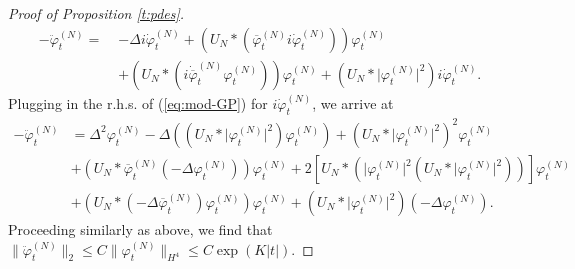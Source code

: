 \documentclass[11pt,a4paper,DIV11]{scrartcl}	%
\newcommand{\ph}{\varphi_t^{(N)}}	%
\newcommand{\phdot}{\dot{\varphi}_t^{(N)}}	%
\newcommand{\phddot}{\ddot{\varphi}_t^{(N)}}	%
\begin{document}
\begin{proof}[Proof of Proposition \ref{t:pdes}]
\[ \begin{split}
-\phddot  = \; &-\Delta i \phdot + \left( U_N \ast (\overline{\varphi}_t^{(N)} i \phdot)\right) \ph \\
&+ \left( U_N \ast (i\dot{\overline{\varphi}}_t^{(N)} \ph) \right) \ph + \left( U_N \ast \lvert\ph\rvert^2 \right) i \phdot.
\end{split}\]
Plugging in the r.h.s. of (\ref{eq:mod-GP}) for $i\phdot$, we arrive at 
\begin{align*}
- \phddot & = \Delta^2 \ph - \Delta \left( (U_N \ast \lvert \ph\rvert^2)\ph \right) + \left( U_N \ast \lvert \ph\rvert^2 \right)^2 \ph \\
& + (U_N \ast \overline{\varphi}_t^{(N)} (-\Delta \ph))\ph + 2 \left[ U_N \ast \left( \lvert \ph\rvert^2 (U_N \ast \lvert \ph\rvert^2) \right) \right] \ph \\
& + (U_N \ast (-\Delta \overline{\varphi}_t^{(N)}) \ph ) \ph + \left( U_N \ast \lvert \ph \rvert^2 \right)(-\Delta \ph).
\end{align*}
Proceeding similarly as above, we find that $\| \ddot \varphi_t^{(N)} \|_{2} \leq C \| \varphi_t^{(N)} \|_{H^4} \leq C \exp (K |t|)$. 


\end{proof}
\end{document}
